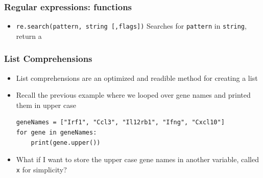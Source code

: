 \documentclass[xcolor=table]{beamer}
\begin{document}
\begin{frame}[fragile]
\frametitle{Regular expressions: functions}
    \begin{itemize}
        \item<1->\texttt{re.search(pattern, string [,flags])} Searches for \texttt{pattern} in \texttt{string}, return a
    \end{itemize}
\end{frame}

\begin{frame}[fragile]
\frametitle{List Comprehensions}

\begin{itemize}\addtolength{\itemsep}{0.5\baselineskip}

\item<1-> List comprehensions are an optimized and readible method for creating a list

\item<2-> Recall the previous example where we looped over gene names and printed them in upper
case
\begin{lstlisting}[style=python]
geneNames = ["Irf1", "Ccl3", "Il12rb1", "Ifng", "Cxcl10"]
for gene in geneNames:
    print(gene.upper())
\end{lstlisting}

\item<3-> What if I want to store the upper case gene names in another variable, 
called \texttt{x} for simplicity?

\end{itemize}

\end{frame}
\end{document}
